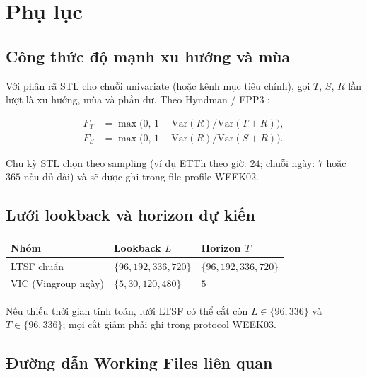 \section{Phụ lục}
\label{sec:appendix}

\subsection{Công thức độ mạnh xu hướng và mùa}

Với phân rã STL cho chuỗi univariate (hoặc kênh mục tiêu chính), gọi \(T\), \(S\), \(R\)
lần lượt là xu hướng, mùa và phần dư. Theo Hyndman / FPP3 \cite{hyndman2021fpp3}:

\begin{align*}
  F_T &= \max\!\bigl(0,\, 1 - \mathrm{Var}(R)/\mathrm{Var}(T+R)\bigr), \\
  F_S &= \max\!\bigl(0,\, 1 - \mathrm{Var}(R)/\mathrm{Var}(S+R)\bigr).
\end{align*}

Chu kỳ STL chọn theo sampling (ví dụ ETTh theo giờ: \(24\); chuỗi ngày: \(7\) hoặc \(365\)
nếu đủ dài) và sẽ được ghi trong file profile WEEK02.

\subsection{Lưới lookback và horizon dự kiến}

\begin{center}
\small
\begin{tabular}{@{}lll@{}}
\toprule
\textbf{Nhóm} & \textbf{Lookback \(L\)} & \textbf{Horizon \(T\)} \\
\midrule
LTSF chuẩn
  & \(\{96, 192, 336, 720\}\)
  & \(\{96, 192, 336, 720\}\) \\
\addlinespace
VIC (Vingroup ngày)
  & \(\{5, 30, 120, 480\}\)
  & \(5\) \\
\bottomrule
\end{tabular}
\end{center}

Nếu thiếu thời gian tính toán, lưới LTSF có thể cắt còn \(L \in \{96,336\}\) và
\(T \in \{96,336\}\); mọi cắt giảm phải ghi trong protocol WEEK03.

\subsection{Đường dẫn Working Files liên quan}

